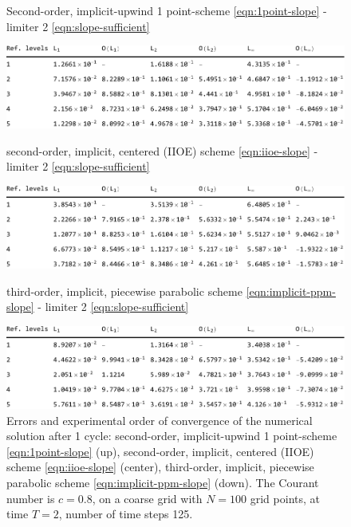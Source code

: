 \documentclass[../thesis.tex]{subfiles}
\begin{document}
\begin{figure}[H]
	\centering
    \caption*{Second-order, implicit-upwind 1 point-scheme \eqref{eqn:1point-slope} - limiter 2 \eqref{eqn:slope-sufficient}}
	\includegraphics[width=\textwidth]{../tab/tab-1point-c0p8-T2-limit2-shu.pdf}
    \caption*{second-order, implicit, centered (IIOE) scheme \eqref{eqn:iioe-slope} - limiter 2 \eqref{eqn:slope-sufficient}}
	\includegraphics[width=\textwidth]{../tab/tab-iioe-c0p8-T2-limit2-shu.pdf}
    \caption*{third-order, implicit, piecewise parabolic scheme \eqref{eqn:implicit-ppm-slope} - limiter 2 \eqref{eqn:slope-sufficient}}
	\includegraphics[width=\textwidth]{../tab/tab-implicit-ppm-c0p8-T2-limit2-shu.pdf}
	\caption{Errors and experimental order of convergence of the numerical solution after 1 cycle: second-order, implicit-upwind 1 point-scheme \eqref{eqn:1point-slope} (up), second-order, implicit, centered (IIOE) scheme \eqref{eqn:iioe-slope} (center), third-order, implicit, piecewise parabolic scheme \eqref{eqn:implicit-ppm-slope} (down). The Courant number is \(c = 0.8\), on a coarse grid with \(N = 100\) grid points, at time \(T = 2\), number of time steps 125.}
	\label{tab:c0p8-T2-limit2-shu}
\end{figure}
\end{document}
